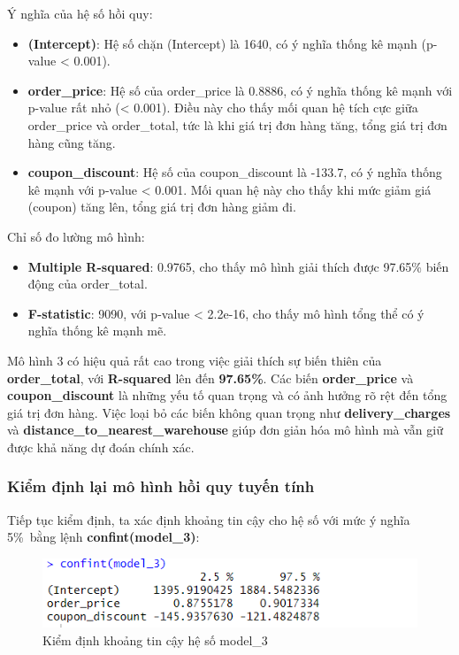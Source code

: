 Ý nghĩa của hệ số hồi quy:
\begin{itemize}
\item\textbf{(Intercept)}: Hệ số chặn (Intercept) là 1640, có ý nghĩa thống kê mạnh (p-value < 0.001).
\item\textbf{order\_price}: Hệ số của order\_price là 0.8886, có ý nghĩa thống kê mạnh với p-value rất nhỏ (< 0.001). Điều này cho thấy mối quan hệ tích cực giữa order\_price và order\_total, tức là khi giá trị đơn hàng tăng, tổng giá trị đơn hàng cũng tăng.
\item\textbf{coupon\_discount}: Hệ số của coupon\_discount là -133.7, có ý nghĩa thống kê mạnh với p-value < 0.001. Mối quan hệ này cho thấy khi mức giảm giá (coupon) tăng lên, tổng giá trị đơn hàng giảm đi.
\end{itemize}

Chỉ số đo lường mô hình:

\begin{itemize}
\item\textbf{Multiple R-squared}: 0.9765, cho thấy mô hình giải thích được 97.65\% biến động của order\_total.
\item\textbf{F-statistic}: 9090, với p-value < 2.2e-16, cho thấy mô hình tổng thể có ý nghĩa thống kê mạnh mẽ.
\end{itemize}

Mô hình 3 có hiệu quả rất cao trong việc giải thích sự biến thiên của \textbf{order\_total}, với \textbf{R-squared} lên đến \textbf{97.65\%}. Các biến \textbf{order\_price} và \textbf{coupon\_discount} là những yếu tố quan trọng và có ảnh hưởng rõ rệt đến tổng giá trị đơn hàng. Việc loại bỏ các biến không quan trọng như \textbf{delivery\_charges} và \textbf{distance\_to\_nearest\_warehouse} giúp đơn giản hóa mô hình mà vẫn giữ được khả năng dự đoán chính xác.

\subsubsection{Kiểm định lại mô hình hồi quy tuyến tính}
Tiếp tục kiểm định, ta xác định khoảng tin cậy cho hệ số với mức ý nghĩa 5\%\ bằng lệnh \textbf{confint(model\_3)}:
\begin{figure}[ht]
  \centering
  \includegraphics[width=0.7\linewidth]{graphics/5.5.5.png}
  \caption{Kiểm định khoảng tin cậy hệ số model\_3 }
\end{figure}

